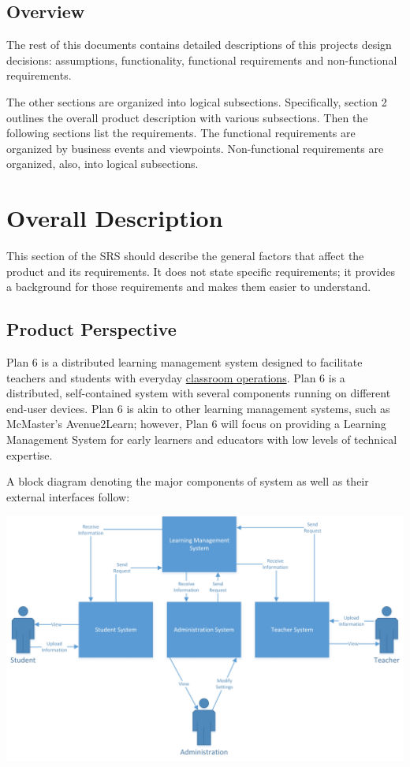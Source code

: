 \documentclass[]{article}
\begin{document}
\subsection{Overview}
\label{sub:overview}
The rest of this documents contains detailed descriptions of this projects
design decisions: assumptions, functionality, functional requirements and
non-functional requirements.

The other sections are organized into logical subsections. Specifically, section
2 outlines the overall product description with various subsections. Then the
following sections list the requirements. The functional requirements are
organized by business events and viewpoints. Non-functional requirements are
organized, also, into logical subsections.




\section{Overall Description}
\label{sec:overall_description}

This section of the SRS should describe the general factors that affect the
product and its requirements. It does not state specific requirements; it
provides a background for those requirements and makes them easier to
understand.

\subsection{Product Perspective}
\label{sub:product_perspective}
Plan 6 is a distributed learning management system designed to facilitate
teachers and students with everyday \underline{classroom operations}. Plan 6 is
a distributed, self-contained system with several components running on
different end-user devices. Plan 6 is akin to other learning management
systems, such as McMaster's Avenue2Learn; however, Plan 6 will focus on
providing a Learning Management System for early learners and educators with
low levels of technical expertise.

A block diagram denoting the major components of system as well as their
external interfaces follow:

\begin{center}
\includegraphics[scale=0.7]{A1_Assets/2-1_Product_Perspective_Diagram.jpg}
\end{center}
\end{document}
